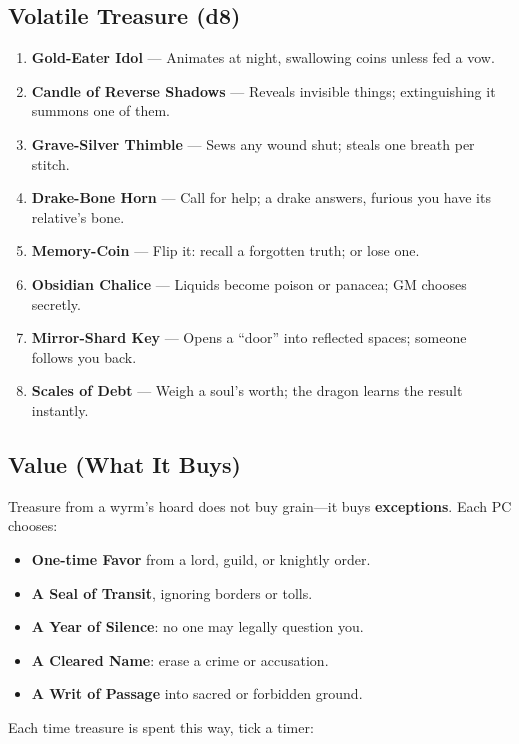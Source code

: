 \documentclass[11pt,letterpaper]{article}
\begin{document}
\subsection{Volatile Treasure (d8)}

\begin{enumerate}[leftmargin=*]
\item \textbf{Gold-Eater Idol} --- Animates at night, swallowing coins unless fed a vow.
\item \textbf{Candle of Reverse Shadows} --- Reveals invisible things; extinguishing it summons one of them.
\item \textbf{Grave-Silver Thimble} --- Sews any wound shut; steals one breath per stitch.
\item \textbf{Drake-Bone Horn} --- Call for help; a drake answers, furious you have its relative's bone.
\item \textbf{Memory-Coin} --- Flip it: recall a forgotten truth; or lose one.
\item \textbf{Obsidian Chalice} --- Liquids become poison or panacea; GM chooses secretly.
\item \textbf{Mirror-Shard Key} --- Opens a ``door'' into reflected spaces; someone follows you back.
\item \textbf{Scales of Debt} --- Weigh a soul's worth; the dragon learns the result instantly.
\end{enumerate}

\subsection{Value (What It Buys)}

Treasure from a wyrm's hoard does not buy grain---it buys \textbf{exceptions}. Each PC chooses:

\begin{itemize}[leftmargin=*]
\item \textbf{One-time Favor} from a lord, guild, or knightly order.
\item \textbf{A Seal of Transit}, ignoring borders or tolls.
\item \textbf{A Year of Silence}: no one may legally question you.
\item \textbf{A Cleared Name}: erase a crime or accusation.
\item \textbf{A Writ of Passage} into sacred or forbidden ground.
\end{itemize}

Each time treasure is spent this way, tick a timer:
\end{document}
